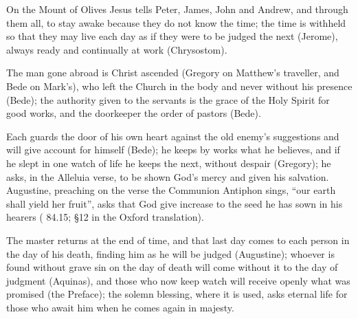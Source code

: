\begin{fourSenses}
\item[Literal.] On the Mount of Olives Jesus tells Peter, James, John and
Andrew, and through them all, to stay awake because they do not know the
time; the time is withheld so that they may live each day as if they were to
be judged the next (Jerome), always ready and continually at work
(Chrysostom).
\item[Allegorical.] The man gone abroad is Christ ascended (Gregory on
Matthew's traveller, and Bede on Mark's), who left the Church in the body and
never without his presence (Bede); the authority given to the servants is the grace of the Holy Spirit
for good works, and the doorkeeper the order of pastors (Bede).
\item[Moral.] Each guards the door of his own heart against the old enemy's
suggestions and will give account for himself (Bede); he keeps by works what
he believes, and if he slept in one watch of life he keeps the next, without
despair (Gregory); he asks, in the Alleluia verse, to be shown God's mercy and
given his salvation. Augustine, preaching on the verse the Communion Antiphon
sings, ``our earth shall yield her fruit'', asks that God give increase to
the seed he has sown in his hearers ( 84.15;
§12 in the Oxford translation).
\item[Anagogical.] The master returns at the end of time, and that last day
comes to each person in the day of his death, finding him as he will be
judged (Augustine); whoever is found without grave sin on the day of death
will come without it to the day of judgment (Aquinas), and those who now
keep watch will receive openly what was promised (the Preface); the solemn
blessing, where it is used, asks eternal life for those who await him when he
comes again in majesty.
\end{fourSenses}
